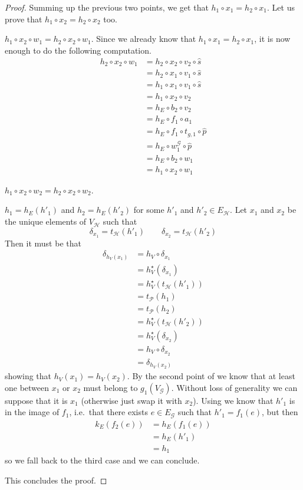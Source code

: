 \documentclass[runningheads,envcountsect]{llncs}
\begin{document}
\begin{proof}
	\medskip Summing up the previous two points, we get that $h_1\circ x_1=h_2\circ x_1$. Let us prove that $h_1\circ x_2=h_2\circ x_2$ too.
	
	\smallskip \noindent $h_1\circ x_2\circ w_1=h_2\circ x_2\circ w_1$. Since we already know that $h_1\circ x_1=h_2\circ x_1$, it is now enough to do the following computation.
	\begin{align*}
		h_2\circ x_2\circ w_1&=h_2\circ x_2\circ v_2\circ \hat{s}\\&=h_2\circ x_1\circ v_1\circ \hat{s}\\&=h_1\circ x_1\circ v_1\circ \hat{s}\\&=h_1\circ x_2\circ v_2\\&=h_E\circ b_2\circ v_2\\&=h_E\circ f_1\circ a_1\\&=h_E\circ f_1\circ t_{g,1}\circ \hat{p}\\&=h_E\circ w^{\mathcal{{G}}}_1\circ \hat{p}\\&=h_E\circ b_2\circ w_1\\&=h_1\circ x_2\circ w_1
	\end{align*}
	
	\smallskip \noindent $h_1\circ x_2\circ w_2=h_2\circ x_2\circ w_2$.
	
	
	$h_1=h_E(h'_1)$ and $h_2=h_E(h'_2)$ for some $h'_1$ and $h'_2\in E_{\mathcal{H}}$. Let $x_1$ and $x_2$ be the unique elements of $V_{\mathcal{H}}$ such that
	\[\delta_{x_1}=t_{\mathcal{H}}(h'_1) \qquad \delta_{x_2}=t_{\mathcal{H}}(h'_2)\]
	Then it must be that
	\begin{align*}\delta_{h_V(x_1)}&=h_V\circ \delta_{x_1}\\&=h^\star_V(\delta_{x_1})\\&=h^\star_V(t_{\mathcal{H}}(h'_1))\\&=t_{\mathcal{P}}(h_1)\\&=t_{\mathcal{P}}(h_2)\\&=h^\star_V(t_{\mathcal{H}}(h'_2))\\&=h^\star_V(\delta_{x_2})\\&=h_V\circ \delta_{x_2}\\&=\delta_{h_V(x_2)}
	\end{align*}
	showing that $h_V(x_1)=h_V(x_2)$. By the second point of   we know that at least one between $x_1$ or $x_2$ must belong to $g_1(V_{\mathcal{G}})$. Without loss of generality we can suppose that it is $x_1$ (otherwise just swap it with $x_2$). Using  we know that $h'_1$ is in the image of $f_1$, i.e.~that there exists $e\in E_\mathcal{\mathcal{G}}$ such that $h'_1=f_1(e)$, but then
	\begin{align*}
		k_E(f_2(e))&=h_E(f_1(e))\\&=h_E(h'_1)\\&=h_1
	\end{align*} 
	so we fall back to the third case and we can conclude.

This concludes the proof.
\end{proof}
\end{document}
